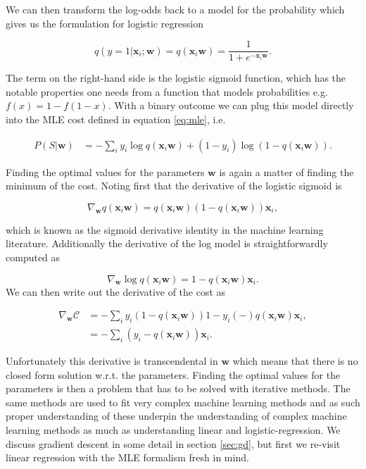 We can then transform the log-odds back to a model for the probability which gives us the formulation for logistic regression 

\begin{equation}
q(y=1 | \mathbf{x}_i; \mathbf{w})= q(\mathbf{x}_i\mathbf{w}) = \frac{1}{1 + e^{-\mathbf{x}_i \mathbf{w}}}.
\end{equation} 

\noindent The term on the right-hand side is the logistic sigmoid function, which has the notable properties one needs from a function that models probabilities e.g. $f(x) = 1-f(1-x)$. With a binary outcome we can plug this model directly into the MLE cost defined in equation \ref{eq:mle}, i.e. 

\begin{align}\label{eq:mle_lr}
P(S|\mathbf{w}) &=  - \sum_i y_i\log q (\mathbf{x}_i\mathbf{w}) + (1-y_i)\log\left(1-q(\mathbf{x}_i\mathbf{w})\right).
\end{align}

\noindent Finding the optimal values for the parameters $\mathbf{w}$ is again a matter of finding the minimum of the cost. Noting first that the derivative of the logistic sigmoid is 

\begin{equation}
\nabla_{\mathbf{w}} q(\mathbf{x}_i \mathbf{w}) = q(\mathbf{x}_i \mathbf{w}) (1 - q(\mathbf{x}_i \mathbf{w}))\mathbf{x}_i,
\end{equation}

\noindent which is known as the sigmoid derivative identity in the machine learning literature. Additionally the derivative of the log model is straightforwardly computed as 

\begin{equation}
\nabla_\mathbf{w} \log q(\mathbf{x}_i \mathbf{w}) = 1- q(\mathbf{x}_i \mathbf{w})\mathbf{x}_i.
\end{equation}
 We can then write out the derivative of the cost as 

\begin{align}
\nabla_{\mathbf{w}} \mathcal{C} &= - \sum_i y_i (1 - q(\mathbf{x}_i \mathbf{w})) 1-y_i (-) q(\mathbf{x}_i \mathbf{w})\mathbf{x}_i, \\
&= - \sum_i \left(y_i -  q(\mathbf{x}_i \mathbf{w})\right)\mathbf{x}_i.
\end{align}

\noindent Unfortunately this derivative is transcendental in $\mathbf{w}$ which means that there is no closed form solution w.r.t. the parameters. Finding the optimal values for the parameters is then a problem that has to be solved with iterative methods. The same methods are used to fit very complex machine learning methods and as such proper understanding of these underpin the understanding of complex machine learning methods as much as understanding linear and logistic-regression. We discuss gradient descent in some detail in section \ref{sec:gd}, but first we re-visit linear regression with the MLE formalism fresh in mind.